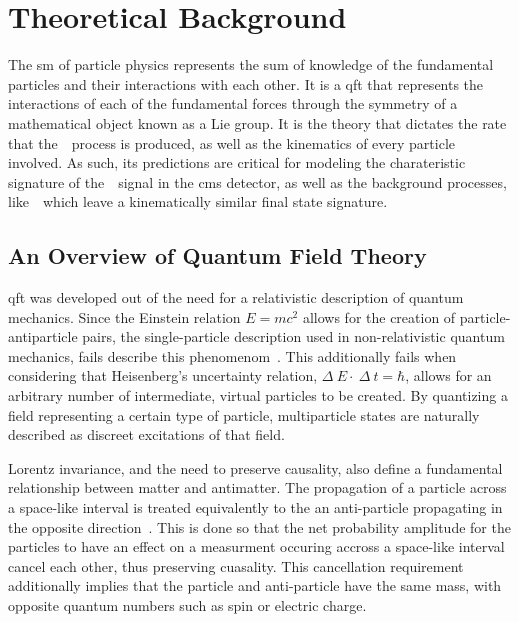 \chapter{Theoretical Background}
\label{theoretical_background}

\par The \acrfull{sm} of particle physics represents the sum of
knowledge of the fundamental particles and their interactions with
each other.  It is a \acrfull{qft} that represents the interactions of each of the
fundamental forces through the symmetry of a mathematical object
known as a Lie group.  It is the theory that dictates the rate that
the~\ttH~process is produced, as well as the kinematics of every
particle involved.  As such, its predictions are critical for modeling
the charateristic signature of the~\ttH~signal in the \acrshort{cms}
detector, as well as the background processes, like~\ttbb~which leave
a kinematically similar final state signature.     


\section{An Overview of Quantum Field Theory}
\label{qft_overview}

\par \acrfull{qft} was developed out of the need for a
relativistic description of quantum mechanics.  Since the Einstein
relation $E=mc^{2}$ allows for the creation of particle-antiparticle
pairs, the single-particle description used in non-relativistic quantum
mechanics, fails describe this phenomenom~\cite{Peskin_Schroeder}.
This additionally fails when considering that Heisenberg's uncertainty
relation, $\Delta~E\cdot~\Delta~t = \hbar$, allows for an arbitrary
number of intermediate, virtual particles to be created.  By
quantizing a field representing a certain type of particle,
multiparticle states are naturally described as discreet excitations
of that field.  

\par Lorentz invariance, and the need to preserve causality, also define a
fundamental relationship between matter and antimatter.  The
propagation of a particle across a space-like interval is treated
equivalently to the an anti-particle propagating in the opposite
direction~\cite{Peskin_Schroeder}.  This is done so that the net
probability amplitude for the particles to have an effect on a 
measurment occuring accross a space-like interval cancel each other,
thus preserving cuasality.  This cancellation requirement additionally
implies that the particle and anti-particle have the same mass, with
opposite quantum numbers such as spin or electric charge.   

